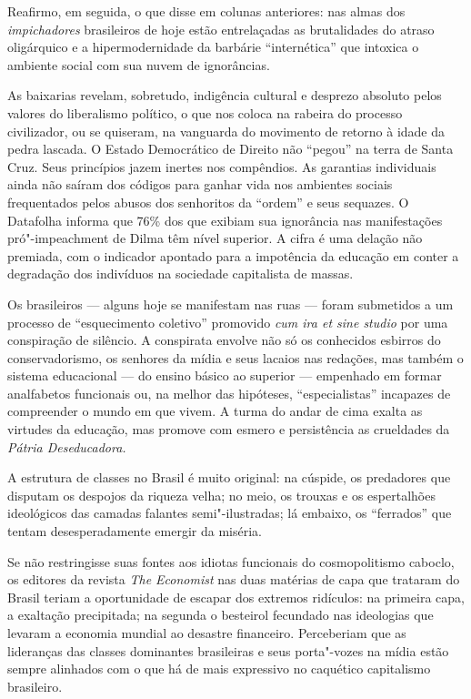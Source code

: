 Reafirmo, em seguida, o que disse em colunas anteriores: nas almas dos
\emph{impichadores} brasileiros de hoje estão entrelaçadas as
brutalidades do atraso oligárquico e a hipermodernidade da barbárie
``internética'' que intoxica o ambiente social com sua nuvem de
ignorâncias.

As baixarias revelam, sobretudo, indigência cultural e desprezo absoluto
pelos valores do liberalismo político, o que nos coloca na rabeira do
processo civilizador, ou se quiseram, na vanguarda do movimento de
retorno à idade da pedra lascada. O Estado Democrático de Direito não
``pegou'' na terra de Santa Cruz. Seus princípios jazem inertes nos
compêndios. As garantias individuais ainda não saíram dos códigos para
ganhar vida nos ambientes sociais frequentados pelos abusos dos
senhoritos da ``ordem'' e seus sequazes. O Datafolha informa que 76\%
dos que exibiam sua ignorância nas manifestações pró"-impeachment de
Dilma têm nível superior. A cifra é uma delação não premiada, com o
indicador apontado para a impotência da educação em conter a degradação
dos indivíduos na sociedade capitalista de massas.

Os brasileiros --- alguns hoje se manifestam nas ruas --- foram submetidos
a um processo de ``esquecimento coletivo'' promovido \emph{cum ira et sine
studio} por uma conspiração de silêncio. A conspirata envolve não só os
conhecidos esbirros do conservadorismo, os senhores da mídia e seus
lacaios nas redações, mas também o sistema educacional --- do ensino
básico ao superior --- empenhado em formar analfabetos funcionais ou, na
melhor das hipóteses, ``especialistas'' incapazes de compreender o mundo
em que vivem. A turma do andar de cima exalta as virtudes da educação,
mas promove com esmero e persistência as crueldades da \emph{Pátria
Deseducadora.}

A estrutura de classes no Brasil é muito original: na cúspide, os
predadores que disputam os despojos da riqueza velha; no meio, os
trouxas e os espertalhões ideológicos das camadas falantes
semi"-ilustradas; lá embaixo, os ``ferrados'' que tentam desesperadamente
emergir da miséria.

Se não restringisse suas fontes aos idiotas funcionais do cosmopolitismo
caboclo, os editores da revista \emph{The Economist} nas duas matérias de
capa que trataram do Brasil teriam a oportunidade de escapar dos
extremos ridículos: na primeira capa, a exaltação precipitada; na
segunda o besteirol fecundado nas ideologias que levaram a economia
mundial ao desastre financeiro. Perceberiam que as lideranças das
classes dominantes brasileiras e seus porta"-vozes na mídia estão sempre
alinhados com o que há de mais expressivo no caquético capitalismo
brasileiro.

